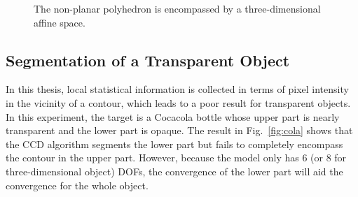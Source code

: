 \begin{figure}[htbp]
\begin{minipage}[t]{0.5\linewidth}
  \end{minipage} 
  \begin{minipage}[t]{0.5\linewidth} 
    \centering 
  \end{minipage} 
\caption[three-dimensional affine shape-space for rigid object]{The
  non-planar polyhedron is encompassed by a three-dimensional affine space.}
\label{fig:container}
\end{figure}

\subsection{Segmentation of a Transparent Object}
\label{sec:sto}
In this thesis, local statistical information is collected in terms of
pixel intensity in the vicinity of a contour, which leads to a poor
result for transparent objects. In this experiment, the
target is a Cocacola bottle whose upper part is nearly transparent and the
lower part is opaque. The result in Fig.~\ref{fig:cola} shows that the CCD algorithm
segments the lower part but fails to completely encompass the contour in the
upper part. However, because the model only has 6 (or 8
for three-dimensional object) DOFs, the convergence of the lower part will aid the convergence for the whole object.


